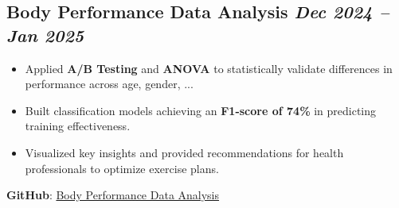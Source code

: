\subsection*{Body Performance Data Analysis \hfill \textit{Dec 2024 – Jan 2025}}

\begin{itemize}
  \item Applied \textbf{A/B Testing} and \textbf{ANOVA} to statistically validate differences in performance across age, gender, ...  
  \item Built classification models achieving an \textbf{F1-score of 74\%} in predicting training effectiveness.  
  \item Visualized key insights and provided recommendations for health professionals to optimize exercise plans.  
\end{itemize}
\textbf{GitHub}: \href{https://github.com/xuanduong2711/BODY_PERFORMANCE.git}{Body Performance Data Analysis}